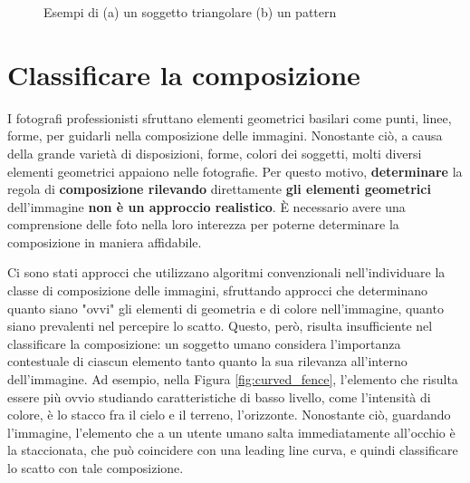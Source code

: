 \begin{figure}[h]
    \centering
    \quad
    \caption{Esempi di (a) un soggetto triangolare (b) un pattern}
    \label{fig:shape_patterns}
\end{figure}

\section{Classificare la composizione}
I fotografi professionisti sfruttano elementi geometrici basilari come punti, linee, forme, per guidarli nella composizione delle immagini. Nonostante ciò, a causa della grande varietà di disposizioni, forme, colori dei soggetti, molti diversi elementi geometrici appaiono nelle fotografie. Per questo motivo, \textbf{determinare} la regola di \textbf{composizione rilevando} direttamente \textbf{gli elementi geometrici} dell'immagine \textbf{non è un approccio realistico}. È necessario avere una comprensione delle foto nella loro interezza per poterne determinare la composizione in maniera affidabile.

Ci sono stati approcci \cite{fuzzy2012} che utilizzano algoritmi convenzionali nell'individuare la classe di composizione delle immagini, sfruttando approcci che determinano quanto siano "ovvi" gli elementi di geometria e di colore nell'immagine, quanto siano prevalenti nel percepire lo scatto. Questo, però, risulta insufficiente nel classificare la composizione: un soggetto umano considera l'importanza contestuale di ciascun elemento tanto quanto la sua rilevanza all'interno dell'immagine. Ad esempio, nella Figura \ref{fig:curved_fence}, l'elemento che risulta essere più ovvio studiando caratteristiche di basso livello, come l'intensità di colore, è lo stacco fra il cielo e il terreno, l'orizzonte. Nonostante ciò, guardando l'immagine, l'elemento che a un utente umano salta immediatamente all'occhio è la staccionata, che può coincidere con una leading line curva, e quindi classificare lo scatto con tale composizione.


